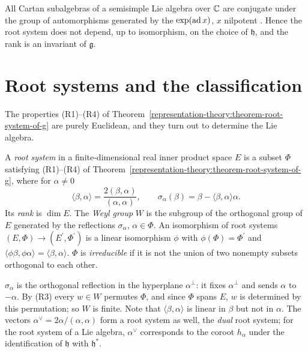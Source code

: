 \begin{remark}\label{representation-theory:remark-conjugacy}
All Cartan subalgebras of a semisimple Lie algebra over $\mathbb{C}$ are conjugate under the group of automorphisms generated by the $\exp(\operatorname{ad} x)$, $x$ nilpotent \cite[Section 16]{humphreys-lie}.
Hence the root system does not depend, up to isomorphism, on the choice of $\mathfrak{h}$, and the rank is an invariant of $\mathfrak{g}$.
\end{remark}

\section{Root systems and the classification}\label{representation-theory:section-root-systems}

The properties (R1)--(R4) of Theorem~\ref{representation-theory:theorem-root-system-of-g} are purely Euclidean, and they turn out to determine the Lie algebra.

\begin{definition}\label{representation-theory:definition-root-system}
A \emph{root system} in a finite-dimensional real inner product space $E$ is a subset $\Phi$ satisfying (R1)--(R4) of Theorem~\ref{representation-theory:theorem-root-system-of-g},
where for $\alpha \neq 0$
\[
\langle\beta, \alpha\rangle = \frac{2(\beta, \alpha)}{(\alpha, \alpha)}, \qquad \sigma_\alpha(\beta) = \beta - \langle\beta, \alpha\rangle\alpha .
\]
Its \emph{rank} is $\dim E$. The \emph{Weyl group} $W$ is the subgroup of the orthogonal group of $E$ generated by the reflections $\sigma_\alpha$, $\alpha \in \Phi$. An isomorphism of root
systems $(E, \Phi) \to (E^{\prime}, \Phi^{\prime})$ is a linear isomorphism $\phi$ with $\phi(\Phi) = \Phi^{\prime}$ and $\langle\phi\beta, \phi\alpha\rangle = \langle\beta, \alpha\rangle$.
$\Phi$ is \emph{irreducible} if it is not the union of two nonempty subsets orthogonal to each other.
\end{definition}

$\sigma_\alpha$ is the orthogonal reflection in the hyperplane $\alpha^\perp$: it fixes $\alpha^\perp$ and sends $\alpha$ to $-\alpha$. By (R3) every $w \in W$ permutes $\Phi$, and since
$\Phi$ spans $E$, $w$ is determined by this permutation; so $W$ is finite. Note that $\langle\beta, \alpha\rangle$ is linear in $\beta$ but not in $\alpha$. The vectors
$\alpha^\vee = 2\alpha/(\alpha, \alpha)$ form a root system as well, the \emph{dual} root system; for the root system of a Lie algebra, $\alpha^\vee$ corresponds to the coroot $h_\alpha$
under the identification of $\mathfrak{h}$ with $\mathfrak{h}^*$.


